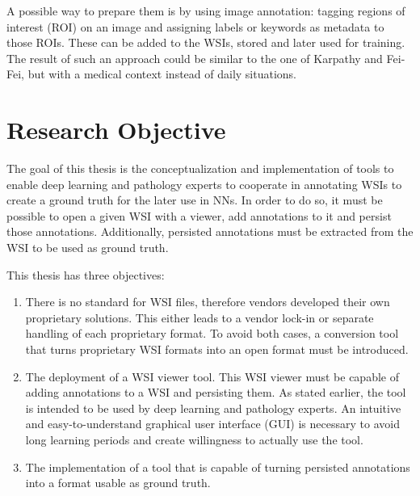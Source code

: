 A possible way to prepare them is by using image annotation: tagging regions of interest (ROI) on an image and assigning labels or keywords as metadata to those ROIs. These can be added to the WSIs, stored and later used for training. The result of such an approach could be similar to the one of Karpathy and Fei-Fei\cite{Karpathy15}, but with a medical context instead of daily situations.


\section{Research Objective}
\label{sec1_researchObjective}
The goal of this thesis is the conceptualization and implementation of tools to enable deep learning and pathology experts to cooperate in annotating WSIs to create a ground truth for the later use in NNs. In order to do so, it must be possible to open a given WSI with a viewer, add annotations to it and persist those annotations. Additionally, persisted annotations must be extracted from the WSI to be used as ground truth.





This thesis has three objectives:
\begin{enumerate}[(1)]
	\item There is no standard for WSI files, therefore vendors developed their own proprietary solutions\cite{Cornish13}. This either leads to a vendor lock-in or separate handling of each proprietary format. To avoid both cases, a conversion tool that turns proprietary WSI formats into an open format must be introduced.
	\item The deployment of a WSI viewer tool. This WSI viewer must be capable of adding annotations to a WSI and persisting them. As stated earlier, the tool is intended to be used by deep learning and pathology experts. An intuitive and easy-to-understand graphical user interface (GUI) is necessary to avoid long learning periods and create willingness to actually use the tool.
	\item The implementation of a tool that is capable of turning persisted annotations into a format usable as ground truth.
\end{enumerate}

